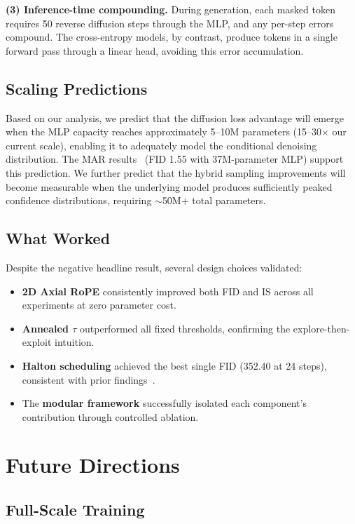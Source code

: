\documentclass[conference]{IEEEtran}
\begin{document}
\textbf{(3) Inference-time compounding.} During generation, each masked token requires 50 reverse diffusion steps through the MLP, and any per-step errors compound. The cross-entropy models, by contrast, produce tokens in a single forward pass through a linear head, avoiding this error accumulation.

\subsection{Scaling Predictions}

Based on our analysis, we predict that the diffusion loss advantage will emerge when the MLP capacity reaches approximately 5--10M parameters (15--30$\times$ our current scale), enabling it to adequately model the conditional denoising distribution. The MAR results~\cite{li2024mar} (FID 1.55 with 37M-parameter MLP) support this prediction. We further predict that the hybrid sampling improvements will become measurable when the underlying model produces sufficiently peaked confidence distributions, requiring $\sim$50M+ total parameters.

\subsection{What Worked}

Despite the negative headline result, several design choices validated:
\begin{itemize}
\item \textbf{2D Axial RoPE} consistently improved both FID and IS across all experiments at zero parameter cost.
\item \textbf{Annealed $\tau$} outperformed all fixed thresholds, confirming the explore-then-exploit intuition.
\item \textbf{Halton scheduling} achieved the best single FID (352.40 at 24 steps), consistent with prior findings~\cite{besnier2025halton}.
\item The \textbf{modular framework} successfully isolated each component's contribution through controlled ablation.
\end{itemize}


\section{Future Directions}
\label{sec:future}

\subsection{Full-Scale Training}
\end{document}
